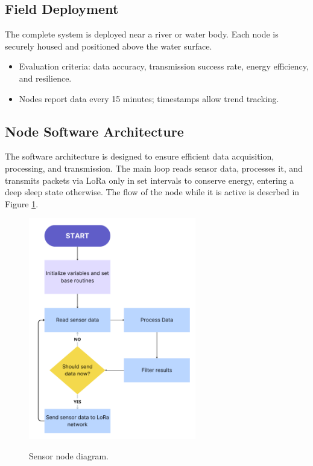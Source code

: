 \subsection{Field Deployment}
The complete system is deployed near a river or water body. Each node is securely housed and positioned above the water surface.
\begin{itemize}
\item Evaluation criteria: data accuracy, transmission success rate, energy efficiency, and resilience.
\item Nodes report data every 15 minutes; timestamps allow trend tracking.
\end{itemize}

\subsection{Node Software Architecture}
The software architecture is designed to ensure efficient data acquisition, processing, and transmission. The main loop reads sensor data, processes it, and transmits packets via LoRa only in set intervals to conserve energy, entering a deep sleep state otherwise. The flow of the node while it is active is descrbed in Figure \ref{fig:sensor_node_software_diagram}.	

\begin{figure}[h]
	\centering
	\caption{Sensor node diagram.}
	\includegraphics[width=0.65\textwidth]{figuras/sensor_node_software_diagram.PNG}
	\label{fig:sensor_node_software_diagram}
\end{figure}

